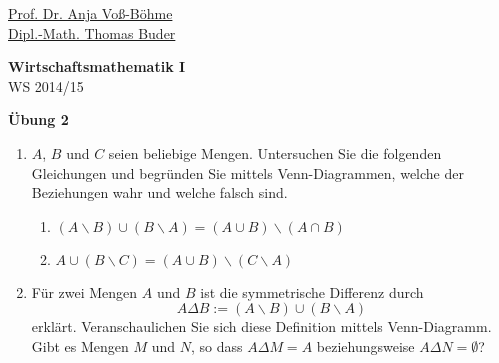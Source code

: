 \documentclass[12pt,a4paper]{scrreprt}
\begin{document}
 
\begin{flushleft}
\href{mailto:anja.voss-boehme@htw-dresden.de}{Prof. Dr. Anja Voß-Böhme} \\
\href{mailto:buder@htw-dresden.de}{Dipl.-Math. Thomas Buder}
\end{flushleft}

\begin{center}
\large{\textbf{ Wirtschaftsmathematik I}} \\
WS 2014/15 \end{center}

\begin{center}\large{\textbf{ Übung 2 }} \end{center}

\bigskip
\begin{enumerate}
 			
		 \item $A$, $B$ und $C$ seien beliebige Mengen. Untersuchen Sie die folgenden 							Gleichungen und begründen Sie mittels Venn-Diagrammen, welche der 									Beziehungen wahr und welche falsch sind.
		 				\begin{enumerate}
		 				\item $(A \backslash B) \cup (B \backslash A) = (A \cup B) \backslash (A                    \cap B)$
						\item $A \cup (B \backslash C) = (A \cup B) \backslash (C \backslash A)$
					\end{enumerate}
								\item Für zwei Mengen $A$ und $B$ ist die symmetrische Differenz     
								durch
						\[A \Delta B := (A \backslash B) \cup (B \backslash A)\]
						erklärt. Veranschaulichen Sie sich diese Definition mittels 
						Venn-Diagramm. 
						Gibt es Mengen $M$ und $N$, so dass $A\Delta M = A$ 
						beziehungsweise $A \Delta N = \emptyset$?		
					

\end{enumerate}
\end{document}

